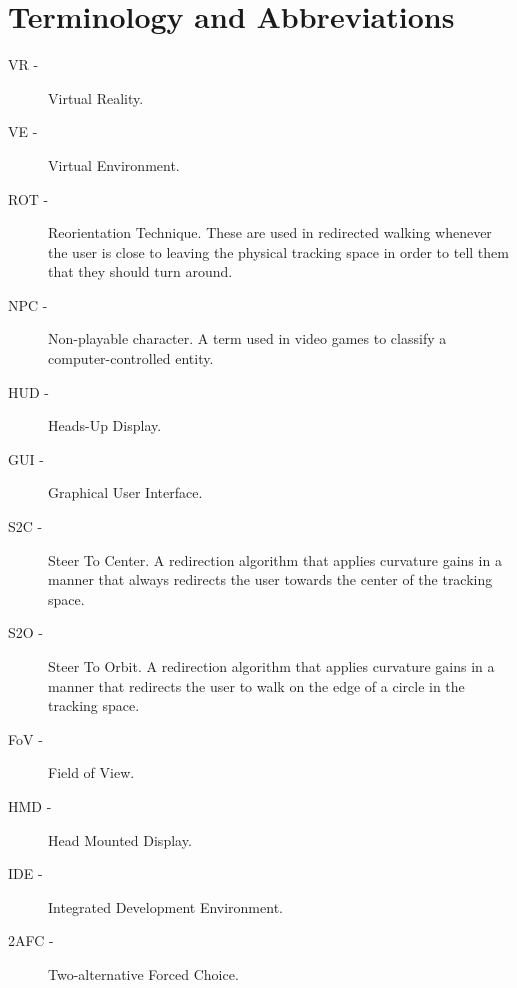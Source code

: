 \chapter{Terminology and Abbreviations}\label{app:terminology}

\begin{description}
\item[VR -] Virtual Reality.
\item[VE -] Virtual Environment.
\item[ROT -] Reorientation Technique. These are used in redirected walking whenever the user is close to leaving the physical tracking space in order to tell them that they should turn around. \item[NPC -] Non-playable character. A term used in video games to classify a computer-controlled entity.
\item[HUD -] Heads-Up Display.
\item[GUI -] Graphical User Interface.
\item[S2C -] Steer To Center. A redirection algorithm that applies curvature gains in a manner that always redirects the user towards the center of the tracking space.
\item[S2O -] Steer To Orbit. A redirection algorithm that applies curvature gains in a manner that redirects the user to walk on the edge of a circle in the tracking space.
\item[FoV -] Field of View.
\item[HMD -] Head Mounted Display.
\item[IDE -] Integrated Development Environment.
\item[2AFC - ] Two-alternative Forced Choice.
\end{description}